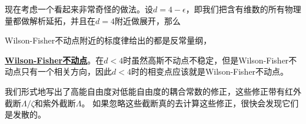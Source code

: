\documentclass[hyperref, UTF8, a4paper]{ctexart}
\newcommand*{\concept}[1]{\underline{\textbf{#1}}}
\begin{document}
现在考虑一个看起来非常奇怪的做法。设$d=4 - \epsilon$，即我们把含有维数的所有物理量都做解析延拓，并且在$d=4$附近做展开，那么

Wilson-Fisher不动点附近的标度律给出的都是反常量纲，

\concept{Wilson-Fisher不动点}。在$d<4$时虽然高斯不动点不稳定，但是Wilson-Fisher不动点只有一个相关方向，因此$d<4$时的相变点应该就是Wilson-Fisher不动点。

我们形式地写出了高能自由度对低能自由度的耦合常数的修正，这些修正带有红外截断$\Lambda / \zeta$和紫外截断$\Lambda$。
如果忽略这些截断真的去计算这些修正，很快会发现它们是发散的。
\end{document}
